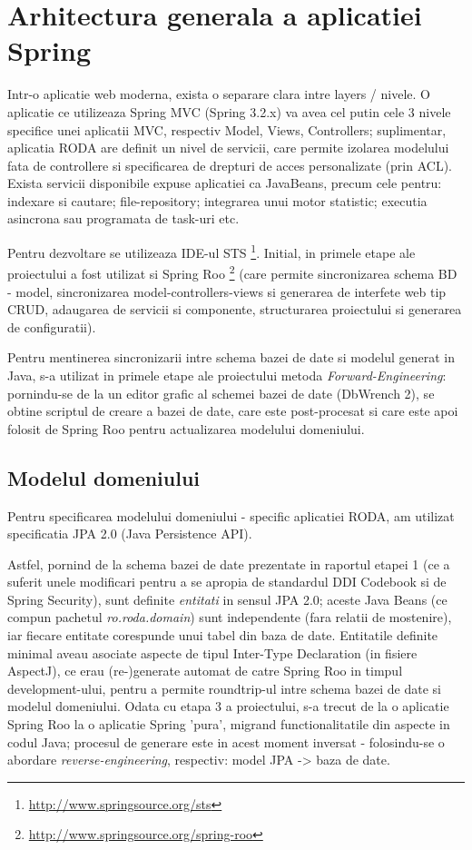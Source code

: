 \section{Arhitectura generala a aplicatiei Spring}

Intr-o aplicatie web moderna, exista o separare clara intre layers /
nivele. O aplicatie ce utilizeaza Spring MVC (Spring 3.2.x) va avea cel putin
cele 3 nivele specifice unei aplicatii MVC, respectiv Model, Views, Controllers; 
suplimentar, aplicatia RODA are definit un nivel de servicii, 
care permite izolarea modelului fata de controllere si specificarea de drepturi de acces personalizate (prin ACL). 
Exista servicii disponibile expuse aplicatiei ca JavaBeans, precum cele pentru: 
indexare si cautare; file-repository; 
integrarea unui motor statistic; 
executia asincrona sau programata de task-uri etc.


Pentru dezvoltare se utilizeaza IDE-ul STS
\footnote{\url{http://www.springsource.org/sts}}.
Initial, in primele etape ale proiectului a fost utilizat si Spring Roo
\footnote{\url{http://www.springsource.org/spring-roo}}
(care permite sincronizarea schema BD - model, sincronizarea model-controllers-views si generarea de
interfete web tip CRUD, adaugarea de servicii si componente, structurarea proiectului si generarea de configuratii).

Pentru mentinerea sincronizarii intre schema bazei de date si modelul generat
in Java, s-a utilizat in primele etape ale proiectului metoda \emph{Forward-Engineering}: 
pornindu-se de la un editor grafic al schemei bazei de date (DbWrench 2), %
se obtine scriptul de creare a bazei de date, 
care este post-procesat si care este apoi folosit de Spring Roo pentru
actualizarea modelului domeniului.

\subsection{Modelul domeniului}
Pentru specificarea modelului domeniului - specific aplicatiei RODA, 
am utilizat specificatia JPA 2.0 (Java Persistence API).

Astfel, pornind de la schema bazei de date prezentate in raportul etapei 1 (ce
a suferit unele modificari pentru a se apropia de standardul DDI Codebook si
de Spring Security), sunt definite \emph{entitati} in sensul JPA 2.0; 
aceste Java Beans (ce compun pachetul \emph{ro.roda.domain}) 
sunt independente (fara relatii de mostenire),
iar fiecare entitate corespunde unui tabel din baza de date. 
Entitatile definite minimal aveau asociate 
aspecte de tipul Inter-Type Declaration (in fisiere AspectJ), 
ce erau (re-)generate automat de catre Spring Roo in timpul development-ului, 
pentru a permite roundtrip-ul intre schema bazei de date si modelul domeniului.
Odata cu etapa 3 a proiectului, s-a trecut de la o aplicatie Spring Roo 
la o aplicatie Spring 'pura', 
migrand functionalitatile din aspecte in codul Java; 
procesul de generare este in acest moment inversat - 
folosindu-se o abordare \emph{reverse-engineering}, respectiv: model JPA -> baza de date. 

